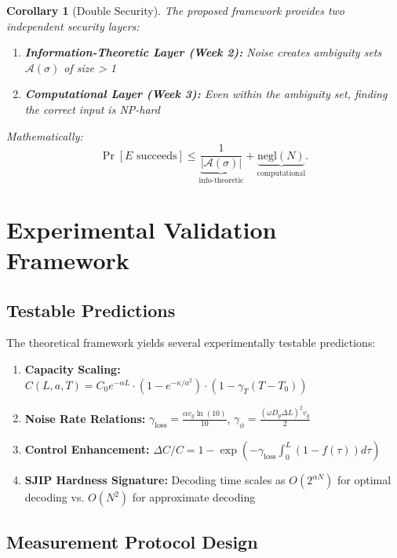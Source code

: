 \documentclass[12pt]{article}
\newtheorem{corollary}[theorem]{Corollary}
\begin{document}
\begin{corollary}[Double Security]
The proposed framework provides two independent security layers:
\begin{enumerate}
    \item \textbf{Information-Theoretic Layer (Week 2):} Noise creates ambiguity sets \(\mathcal{A}(\sigma)\) of size > 1
    \item \textbf{Computational Layer (Week 3):} Even within the ambiguity set, finding the correct input is NP-hard
\end{enumerate}
Mathematically:
\begin{equation}
    \Pr[E\text{ succeeds}] \leq \underbrace{\frac{1}{|\mathcal{A}(\sigma)|}}_{\text{info-theoretic}} + \underbrace{\text{negl}(N)}_{\text{computational}}.
\end{equation}
\end{corollary}

\section{Experimental Validation Framework}

\subsection{Testable Predictions}

The theoretical framework yields several experimentally testable predictions:

\begin{enumerate}
    \item \textbf{Capacity Scaling:} \(C(L,a,T) = C_0 e^{-\alpha L} \cdot (1 - e^{-\kappa/a^2}) \cdot (1 - \gamma_T(T-T_0))\)
    \item \textbf{Noise Rate Relations:} \(\gamma_{\text{loss}} = \frac{\alpha v_g \ln(10)}{10}\), \(\gamma_\phi = \frac{(\omega D_p \Delta L)^2 v_g}{2}\)
    \item \textbf{Control Enhancement:} \(\Delta C/C = 1 - \exp\left(-\gamma_{\text{loss}}\int_0^L (1-f(\tau))d\tau\right)\)
    \item \textbf{SJIP Hardness Signature:} Decoding time scales as \(O(2^{\alpha N})\) for optimal decoding vs. \(O(N^2)\) for approximate decoding
\end{enumerate}

\subsection{Measurement Protocol Design}
\end{document}
